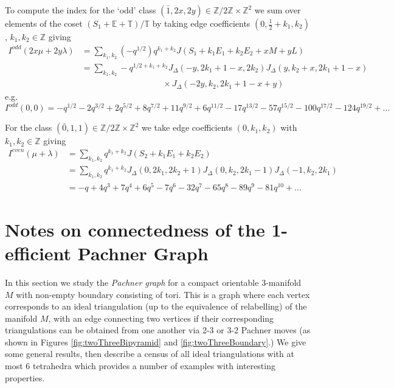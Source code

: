 \documentclass[12pt,reqno]{amsart}  %
\theoremstyle{definition}
\theoremstyle{remark}
\def\E{\mathbb{E}}
\newcommand{\TT}{\mathbb{T}}
\def\Z{\mathbb Z}
\def\JD{J_{\Delta}}
\def\TT{\mathbb T}   %
\begin{document}
To compute the index for the `odd' class 
$(\bar 1,2x,2y) \in \Z/2\Z \times \Z^2$ we sum over elements of the coset 
$(S_1+\E+\TT)/\TT$ by taking edge coefficients $(0,\frac{1}{2}+k_1,k_2)$, 
$k_1,k_2 \in \Z$ giving
\begin{align*}
I^{odd}(2x\mu+2y\lambda) &= \sum_{k_1,k_2} (-q^{1/2})q^{k_1+k_2} 
J(S_1+k_1E_1+k_2E_2+xM+yL) \\
&= \sum_{k_1,k_2}  -q^{1/2+k_1+k_2}\JD(-y,2k_1+1-x,2k_2)  \JD(y,k_2+x,2k_1+1-x)\\
&\hspace{4cm} \times\JD(-2y,k_2,2k_1+1-x+y)
\end{align*} 
e.g.
$$
I^{odd}(0,0)=-q^{1/2}-2 q^{3/2}+2 q^{5/2}+8 q^{7/2}+11 q^{9/2}+6 q^{11/2}
-17 q^{13/2}-57 q^{15/2}-100 q^{17/2}-124 q^{19/2}+\ldots
$$

For the class $(\bar 0, 1,1) \in \Z/2\Z \times \Z^2$ we take edge 
coefficients $(0,k_1,k_2)$ with  $k_1,k_2 \in \Z$  giving
\begin{align*} 
I^{even}(\mu+\lambda) &= \sum_{k_1,k_2} q^{k_1+k_2} J(S_2+k_1E_1+k_2E_2) \\
&= \sum_{k_1,k_2} q^{k_1+k_2}  
\JD(0,2k_1,2k_2+1)\JD(0,k_2,2k_1-1)\JD(-1,k_2,2k_1) \\
&= -q+4 q^3+7 q^4+6 q^5-7 q^6-32 q^7-65 q^8-89 q^9-81 q^{10} + \ldots
\end{align*}


\section{Notes on connectedness of the 1-efficient Pachner Graph}
\label{PachnerGraph}

In this section we study the \emph{Pachner graph} for a compact orientable 
3-manifold $M$ with non-empty boundary consisting of tori. 
This is a graph where each vertex corresponds to an ideal triangulation 
(up to the equivalence of relabelling) of the manifold $M$,
 with an edge connecting two vertices if their corresponding triangulations 
can be obtained from one another via 2-3 or 3-2 
 Pachner moves (as shown in Figures \ref{fig:twoThreeBipyramid} and 
\ref{fig:twoThreeBoundary}.)
 We give some general results, then describe a census of all ideal 
triangulations with at most 6 tetrahedra which provides 
a number of examples with interesting properties. 
 
\end{document}
